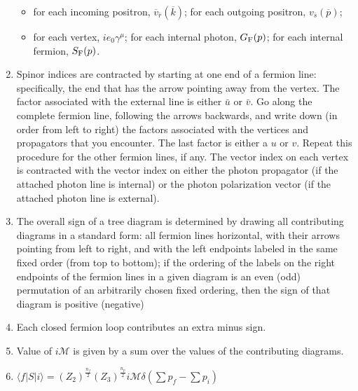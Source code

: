 \begin{enumerate}
\begin{itemize}
\item for each incoming positron, $\overline{v}_{\overline{r}}(\overline{k})$; for each outgoing positron, $v_{\overline{s}}(\overline{p})$;
\item for each vertex, $ie_0 \gamma^{\mu}$;
for each internal photon, $G_{\rm F}(p)$;
for each internal fermion, $S_{\rm F}(p)$.
\end{itemize}
\item Spinor indices are contracted by starting at one end of a fermion line: specifically, the end that has the arrow pointing away from the vertex. The factor associated with the external line is either $\bar{u}$ or $\bar{v}$. Go along the complete fermion line, following the arrows backwards, and write down (in order from left to right) the factors associated with the vertices and propagators that you encounter. The last factor is either a $u$ or $v$. Repeat this procedure for the other fermion lines, if any. The vector index on each vertex is contracted with the vector index on either the photon propagator (if the attached photon line is internal) or the
photon polarization vector (if the attached photon line is external).
\item The overall sign of a tree diagram is determined by drawing all contributing diagrams in a standard form: all fermion lines horizontal, with their arrows pointing from left to right, and with the left endpoints labeled in the same fixed order (from top to bottom); if the ordering of the labels on the right endpoints of the fermion lines in a given diagram is an even (odd) permutation of an arbitrarily chosen fixed ordering, then the sign of that diagram is positive (negative)
\item Each closed fermion loop contributes an extra minus sign.
\item Value of $i\mathcal{M}$ is given by a sum over the values of the contributing diagrams.
\item $\langle f | S | i \rangle = (Z_2)^{\frac{n_f}{2}} (Z_3)^{\frac{n_p}{2}} i\mathcal{M}\delta(\sum p_f -\sum p_i)$
\end{enumerate}

